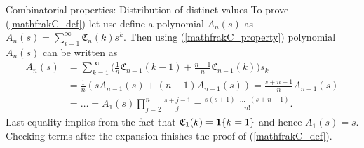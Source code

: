 \begin{frame}[allowframebreaks]{Combinatorial properties: Distribution of distinct values}
To prove (\ref{mathfrakC_def}) let use define a polynomial $A_n(s)$ as $A_n(s) = \sum_{i=1}^\infty \mathfrak{C}_n(k)s^k$. Then using (\ref{mathfrakC_property}) polynomial $A_n(s)$ can be written as
\begin{equation*}
\begin{split}
    A_n(s)&=\sum_{k=1}^\infty \bigg(  \frac 1n \mathfrak{C}_{n-1}(k-1)+\frac{n-1}{n}\mathfrak{C}_{n-1}(k)   \bigg) s_k\\
    &=\frac{1}{n}( s A_{n-1}(s) +(n-1) A_{n-1}(s) )=\frac{s+n-1}{n}A_{n-1}(s)\\
    &=\ldots=A_1(s)\prod_{j=2}^n\frac{s+j-1}{j}=\frac{s(s+1)\cdot\ldots\cdot(s+n-1)}{n!}.
\end{split}
\end{equation*}
Last equality implies from the fact that $\mathfrak{C}_1(k)=\mathbf 1\{k=1\}$ and hence $A_1(s)=s$. Checking terms after the expansion finishes the proof of (\ref{mathfrakC_def}).


\end{frame}




